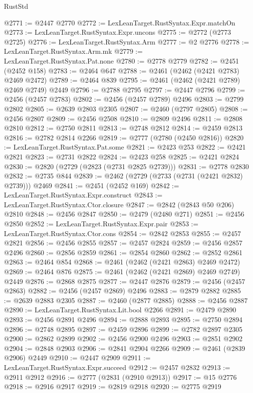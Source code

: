 \begin{lexlean}{RustStd}
\begin{coremodule}
@2771 := @2447 @2770
@2772 := LexLeanTarget.RustSyntax.Expr.matchOn
@2773 := LexLeanTarget.RustSyntax.Expr.uncons
@2775 := @2772 (@2773 @2725)
@2776 := LexLeanTarget.RustSyntax.Arm
@2777 := @2 @2776
@2778 := LexLeanTarget.RustSyntax.Arm.mk
@2779 := LexLeanTarget.RustSyntax.Pat.none
@2780 := @2778 @2779
@2782 := @2451 (@2452 @158)
@2783 := @2464 @647
@2788 := @2461 (@2462 (@2421 @2783) @2469 @2472)
@2789 := @2464 @839
@2795 := @2461 (@2462 (@2421 @2789) @2469 @2749) @2449
@2796 := @2788 @2795
@2797 := @2447 @2796
@2799 := @2456 (@2457 @2783)
@2802 := @2456 (@2457 @2789) @2496
@2803 := @2799 @2802
@2805 := @2639 @2803 @2305
@2807 := @2460 (@2797 @2805)
@2808 := @2456 @2807
@2809 := @2456 @2508
@2810 := @2809 @2496
@2811 := @2808 @2810
@2812 := @2750 @2811
@2813 := @2748 @2812
@2814 := @2459 @2813
@2816 := @2782 @2814 @2266
@2819 := @2777 (@2780 (@2450 @2816))
@2820 := LexLeanTarget.RustSyntax.Pat.some
@2821 := @2423 @253
@2822 := @2421 @2821
@2823 := @2731 @2822
@2824 := @2423 @258
@2825 := @2421 @2824
@2830 := @2820 (@2729 (@2823 (@2731 @2825 @2739)))
@2831 := @2778 @2830
@2832 := @2735 @844
@2839 := @2462 (@2729 (@2733 (@2731 (@2421 @2832) @2739))) @2469
@2841 := @2451 (@2452 @169)
@2842 := LexLeanTarget.RustSyntax.Expr.construct
@2843 := LexLeanTarget.RustSyntax.Ctor.closure
@2847 := @2842 (@2843 @50 @206) @2810
@2848 := @2456 @2847
@2850 := @2479 (@2480 @271)
@2851 := @2456 @2850
@2852 := LexLeanTarget.RustSyntax.Expr.pair
@2853 := LexLeanTarget.RustSyntax.Ctor.cons
@2854 := @2842 @2853
@2855 := @2457 @2821
@2856 := @2456 @2855
@2857 := @2457 @2824
@2859 := @2456 @2857 @2496
@2860 := @2856 @2859
@2861 := @2854 @2860
@2862 := @2852 @2861
@2863 := @2464 @854
@2868 := @2461 (@2462 (@2421 @2863) @2469 @2472)
@2869 := @2464 @876
@2875 := @2461 (@2462 (@2421 @2869) @2469 @2749) @2449
@2876 := @2868 @2875
@2877 := @2447 @2876
@2879 := @2456 (@2457 @2863)
@2882 := @2456 (@2457 @2869) @2496
@2883 := @2879 @2882
@2885 := @2639 @2883 @2305
@2887 := @2460 (@2877 @2885)
@2888 := @2456 @2887
@2890 := LexLeanTarget.RustSyntax.Lit.bool @2266
@2891 := @2479 @2890
@2893 := @2456 @2891 @2496
@2894 := @2888 @2893
@2895 := @2750 @2894
@2896 := @2748 @2895
@2897 := @2459 @2896
@2899 := @2782 @2897 @2305
@2900 := @2862 @2899
@2902 := @2456 @2900 @2496
@2903 := @2851 @2902
@2904 := @2848 @2903
@2906 := @2841 @2904 @2266
@2909 := @2461 (@2839 @2906) @2449
@2910 := @2447 @2909
@2911 := LexLeanTarget.RustSyntax.Expr.succeed
@2912 := @2457 @2832
@2913 := @2911 @2912
@2916 := @2777 (@2831 (@2910 @2913))
@2917 := @15 @2776
@2918 := @2916 @2917
@2919 := @2819 @2918
@2920 := @2775 @2919

\end{coremodule}
\end{lexlean}
